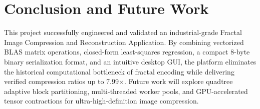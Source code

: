 \documentclass[11pt,a4paper]{article}
\begin{document}
\section{Conclusion and Future Work}
\label{sec:conclusion}

This project successfully engineered and validated an industrial-grade Fractal Image Compression and Reconstruction Application. By combining vectorized BLAS matrix operations, closed-form least-squares regression, a compact 8-byte binary serialization format, and an intuitive desktop GUI, the platform eliminates the historical computational bottleneck of fractal encoding while delivering verified compression ratios up to 7.99$\times$. Future work will explore quadtree adaptive block partitioning, multi-threaded worker pools, and GPU-accelerated tensor contractions for ultra-high-definition image compression.



\end{document}
